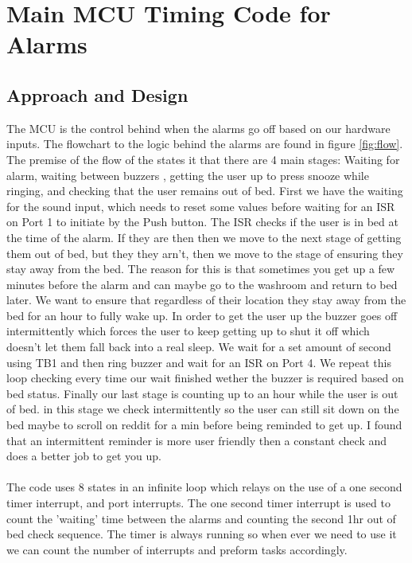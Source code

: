 \documentclass[11pt]{article}
\begin{document}
\section{Main MCU Timing Code for Alarms}
\subsection*{Approach and Design}
The MCU is the control behind when the alarms go off based on our hardware inputs. 
The flowchart to the logic behind the alarms are found in figure \ref{fig:flow}.
The premise of the flow of the states it that there are 4 main stages: Waiting for alarm, waiting between buzzers , getting the user up to press snooze while ringing, and checking that the user remains out of bed.   
First we have the waiting for the sound input, which needs to reset some values before waiting for an ISR on Port 1 to initiate by the Push button.
The ISR checks if the user is in bed at the time of the alarm.
If they are then then we move to the next stage of getting them out of bed, but they they arn't, then we move to the stage of ensuring they stay away from the bed.
The reason for this is that sometimes you get up a few minutes before the alarm and can maybe go to the washroom and return to bed later.
We want to ensure that regardless of their location they stay away from the bed for an hour to fully wake up.  
In order to get the user up the buzzer goes off intermittently which forces the user to keep getting up to shut it off which doesn't let them fall back into a real sleep.
We wait for a set amount of second using TB1 and then ring buzzer and wait for an ISR on Port 4.
We repeat this loop checking every time our wait finished wether the buzzer is required based on bed status. 
Finally our last stage is counting up to an hour while the user is out of bed. 
in this stage we check intermittently so the user can still sit down on the bed maybe to scroll on reddit for a min before being reminded to get up.  
I found that an intermittent reminder is more user friendly then a constant check and does a better job to get you up. \\
\\
The code uses 8 states in an infinite loop which relays on the use of a one second timer interrupt, and port interrupts.
The one second timer interrupt is used to count the 'waiting' time between the alarms and counting the second 1hr out of bed check sequence.
The timer is always running so when ever we need to use it we can count the number of interrupts and preform tasks accordingly. 
\end{document}
